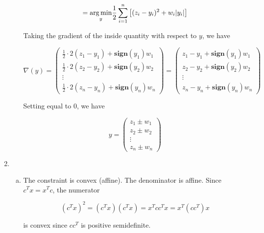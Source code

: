 \begin{enumerate}[(1)]
\begin{enumerate}[(a)]
\[
= \underset{y}{\operatorname*{arg\,min}} \frac{1}{2}  \sum_{i=1}^n \big[ (z_i - y_i)^2  + w_i |y_i| \big]
\]

Taking the gradient of the inside quantity with respect to \(y\), we have

\[
\nabla(y) =  \begin{pmatrix} \frac{1}{2}  \cdot 2 (z_1 - y_1)   + \textbf{sign}(y_1) w_1 \\ 
 \frac{1}{2}  \cdot 2 (z_2 - y_2)  + \textbf{sign}(y_2) w_2 \\ 
 \vdots \\
  \frac{1}{2}  \cdot 2 (z_n - y_n)  + \textbf{sign}(y_n) w_n 
  \end{pmatrix} = \begin{pmatrix} z_1 - y_1  + \textbf{sign}(y_1) w_1 \\ 
 z_2 - y_2  + \textbf{sign}(y_2)w_2 \\ 
 \vdots \\
  z_n - y_n + \textbf{sign}(y_n) w_n 
  \end{pmatrix} 
\]

Setting equal to 0, we have

\[
y = \begin{pmatrix} z_1 \pm w_1 \\ 
 z_2   \pm w_2 \\ 
 \vdots \\
  z_n  \pm w_n 
  \end{pmatrix} 
\]

\end{enumerate}


\item



\begin{enumerate}[(a)]

\item The constraint is convex (affine). The denominator is affine. Since \(c^Tx = x^Tc\), the numerator 

\[
(c^Tx)^2 = (c^T x)( c^T x) = x^T c c^T x = x^T (c c^T) x 
\]

is convex since \(c c^T\) is positive semidefinite.

%


\end{enumerate}
\end{enumerate}
